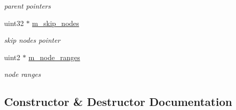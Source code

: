 \begin{DoxyCompactItemize}
\begin{DoxyCompactList}\small\item\em parent pointers \end{DoxyCompactList}\item 
\mbox{\label{structcugar_1_1_bintree__writer__context_3_01node__type_00_01leaf__range__tag_01_4_a0b233f2ddc63063023a214e54e72f7f5}} 
uint32 $\ast$ \hyperlink{structcugar_1_1_bintree__writer__context_3_01node__type_00_01leaf__range__tag_01_4_a0b233f2ddc63063023a214e54e72f7f5}{m\+\_\+skip\+\_\+nodes}
\begin{DoxyCompactList}\small\item\em skip nodes pointer \end{DoxyCompactList}\item 
\mbox{\label{structcugar_1_1_bintree__writer__context_3_01node__type_00_01leaf__range__tag_01_4_a683a9168a955696d6ca5bfd48cdd4ae5}} 
uint2 $\ast$ \hyperlink{structcugar_1_1_bintree__writer__context_3_01node__type_00_01leaf__range__tag_01_4_a683a9168a955696d6ca5bfd48cdd4ae5}{m\+\_\+node\+\_\+ranges}
\begin{DoxyCompactList}\small\item\em node ranges \end{DoxyCompactList}\end{DoxyCompactItemize}


\subsection{Constructor \& Destructor Documentation}
\mbox{\label{structcugar_1_1_bintree__writer__context_3_01node__type_00_01leaf__range__tag_01_4_a4c66b82eca04d8b387f561c7855215d5}} 
